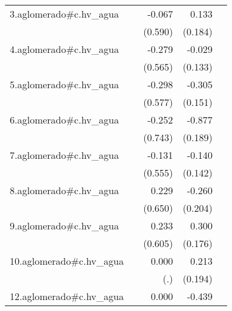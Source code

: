 {\begin{longtable}{l*{4}{D{.}{.}{-1}}}
\addlinespace
3.aglomerado#c.hv\_agua&                     &      -0.067         &       0.133         &                     \\
            &                     &     (0.590)         &     (0.184)         &                     \\
\addlinespace
4.aglomerado#c.hv\_agua&                     &      -0.279         &      -0.029         &                     \\
            &                     &     (0.565)         &     (0.133)         &                     \\
\addlinespace
5.aglomerado#c.hv\_agua&                     &      -0.298         &      -0.305\sym{*}  &                     \\
            &                     &     (0.577)         &     (0.151)         &                     \\
\addlinespace
6.aglomerado#c.hv\_agua&                     &      -0.252         &      -0.877\sym{***}&                     \\
            &                     &     (0.743)         &     (0.189)         &                     \\
\addlinespace
7.aglomerado#c.hv\_agua&                     &      -0.131         &      -0.140         &                     \\
            &                     &     (0.555)         &     (0.142)         &                     \\
\addlinespace
8.aglomerado#c.hv\_agua&                     &       0.229         &      -0.260         &                     \\
            &                     &     (0.650)         &     (0.204)         &                     \\
\addlinespace
9.aglomerado#c.hv\_agua&                     &       0.233         &       0.300         &                     \\
            &                     &     (0.605)         &     (0.176)         &                     \\
\addlinespace
10.aglomerado#c.hv\_agua&                     &       0.000         &       0.213         &                     \\
            &                     &         (.)         &     (0.194)         &                     \\
\addlinespace
12.aglomerado#c.hv\_agua&                     &       0.000         &      -0.439         &                     \\

\end{longtable}}
